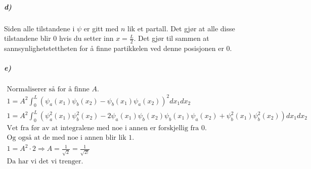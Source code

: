 \documentclass[11pt, A4paper,norsk]{article}
\begin{document}
			\subparagraph{d)}
				\begin{flushleft}
Siden alle tilstandene i $\psi$ er gitt med $n$ lik et partall. Det gjør at alle disse tilstandene blir $0$ hvis du setter inn $x = \frac{L}{2}$. Det gjør til sammen at sannsynlighetstettheten for å finne partikkelen ved denne posisjonen er $0$.
				\end{flushleft}









			\subparagraph{e)}
				\begin{gather*}
\text{Normaliserer så for å finne $A$.} \\
1 = A^2 \int_{0}^{L} \left( \psi_a(x_1) \psi_b(x_2) - \psi_b(x_1) \psi_a(x_2) \right)^2 dx_1 dx_2 \\
1 = A^2 \int_{0}^{L} \left( \psi_a^2(x_1) \psi_b^2(x_2) - 2 \psi_a(x_1) \psi_b(x_2) \psi_b(x_1) \psi_a(x_2) + \psi_b^2(x_1) \psi_b^2(x_2) \right) dx_1 dx_2 \\
\text{Vet fra før av at integralene med noe i annen er forskjellig fra $0$.} \\
\text{Og også at de med noe i annen blir lik $1$.} \\
1 = A^2 \cdot 2 \Rightarrow A = \frac{1}{\sqrt{2}} = \frac{1}{\sqrt{2!}} \\
\text{Da har vi det vi trenger.}
				\end{gather*}
\end{document}
